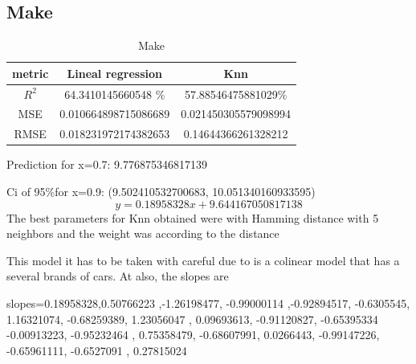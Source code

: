\documentclass{article}
\begin{document}
\subsection{Make}
\begin{table}[H]
\begin{tabular}{|c|c|c|}
  \hline
   metric & Lineal regression & Knn \\ \hline
   $R^2$& 64.3410145660548 \%&57.88546475881029\%\\
   MSE&  0.010664898715086689&  0.021450305579098994\\
   RMSE&0.018231972174382653&0.14644366261328212
   \\
   \hline
  \end{tabular}
  \caption{ Make}
\end{table}
Prediction for x=0.7: 9.776875346817139

Ci of 95\%for x=0.9: (9.502410532700683, 10.051340160933595)
$$y=0.18958328x +9.644167050817138$$
The best parameters for Knn obtained were with Hamming distance with 5 neighbors and the weight was according to the distance

This model it has to be taken with careful due to is a colinear model that has a several brands of cars. At also, the slopes are


slopes=0.18958328,0.50766223 ,-1.26198477, -0.99000114 ,-0.92894517, -0.6305545,
1.16321074, -0.68259389,  1.23056047 , 0.09693613, -0.91120827, -0.65395334
-0.00913223, -0.95232464 , 0.75358479, -0.68607991,  0.0266443,  -0.99147226,
-0.65961111, -0.6527091 ,  0.27815024
\end{document}
